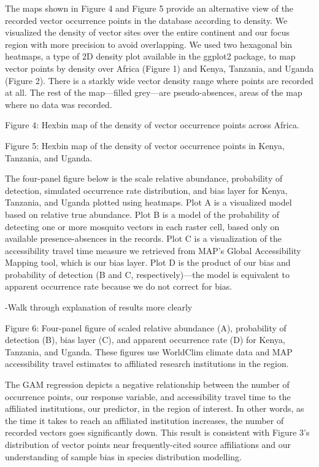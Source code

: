 \documentclass[sn-nature]{sn-jnl}%
\begin{document}
{The maps shown in Figure 4 and Figure 5 provide an alternative view of the recorded vector occurrence points in the database according to density. We visualized the density of vector sites over the entire continent and our focus region with more precision to avoid overlapping. We used two hexagonal bin heatmaps, a type of 2D density plot available in the ggplot2 package, to map vector points by density over Africa (Figure 1) and Kenya, Tanzania, and Uganda (Figure 2). There is a starkly wide vector density range where points are recorded at all. The rest of the map—filled grey—are pseudo-absences, areas of the map where no data was recorded.  


Figure 4: Hexbin map of the density of vector occurrence points across Africa.


 

Figure 5: Hexbin map of the density of vector occurrence points in Kenya, Tanzania, and Uganda.

The four-panel figure below is the scale relative abundance, probability of detection, simulated occurrence rate distribution, and bias layer for Kenya, Tanzania, and Uganda plotted using heatmaps. Plot A is a visualized model based on relative true abundance. Plot B is a model of the probability of detecting one or more mosquito vectors in each raster cell, based only on available presence-absences in the records. Plot C is a visualization of the accessibility travel time measure we retrieved from MAP’s Global Accessibility Mapping tool, which is our bias layer. Plot D is the product of our bias and probability of detection (B and C, respectively)—the model is equivalent to apparent occurrence rate because we do not correct for bias. 

-Walk through explanation of results more clearly

Figure 6: Four-panel figure of scaled relative abundance (A), probability of detection (B), bias layer (C), and apparent occurrence rate (D) for Kenya, Tanzania, and Uganda. These figures use WorldClim climate data and MAP accessibility travel estimates to affiliated research institutions in the region. 

The GAM regression depicts a negative relationship between the number of occurrence points, our response variable, and accessibility travel time to the affiliated institutions, our predictor, in the region of interest. In other words, as the time it takes to reach an affiliated institution increases, the number of recorded vectors goes significantly down. This result is consistent with Figure 3’s distribution of vector points near frequently-cited source affiliations and our understanding of sample bias in species distribution modelling. 


}
\end{document}
